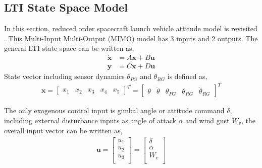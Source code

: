 \documentclass[12pt]{article}
\begin{document}
	\subsection{LTI State Space Model}
	\label{ss}
	In this section, reduced order spacecraft launch vehicle attitude model is revisited \cite{cite1}. This Multi-Input Multi-Output (MIMO) model has 3 inputs and 2 outputs. The general LTI state space can be written as,
	\begin{equation}
	\label{eq1}
	\begin{split}
	\dot{\textbf{x}}&= A\textbf{x} + B\textbf{u}\\
	\textbf{y} &= C\textbf{x} + D\textbf{u}
	\end{split}
	\end{equation}
	\noindent State vector including sensor dynamics $\theta_{PG}$ and $\theta_{RG}$ is defined as, 
	\begin{equation}
	\begin{split}
	\textbf{x} = \begin{bmatrix}
	x_1 &
	x_2 &
	x_3 &
	x_4 &
	x_5
	\end{bmatrix}^{T} = \begin{bmatrix}
	\theta &
	\dot{\theta} &
	\theta_{PG} &
	\theta_{RG}&
	\dot{\theta}_{RG}
	\end{bmatrix}^{T}
	\end{split}
	\end{equation}
	
	\noindent The only exogenous control input is gimbal angle or attitude command $\delta$, including external  disturbance inputs as angle of attack $\alpha$ and wind gust $W_v$, the overall input vector can be written as,
	\begin{equation}
	\begin{split}
	\textbf{u} = \begin{bmatrix}
	u_1 \\ 
	u_2 \\
	u_3 \\
	\end{bmatrix} = \begin{bmatrix}
	\delta\\
	\alpha\\
	W_v\\
	\end{bmatrix}
	\end{split}
	\end{equation}
	
\end{document}

